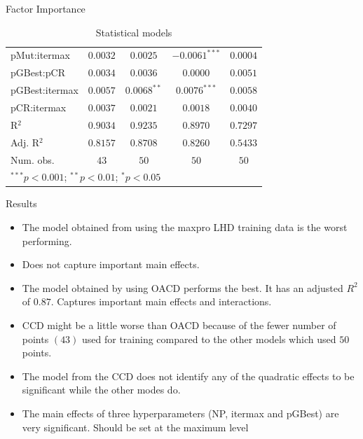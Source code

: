 \documentclass{beamer}
\begin{document}
\begin{frame}{Factor Importance}
\begin{table}
\begin{center}
{\begin{tabular}{l c c c c}
pMut:itermax   & $0.0032$        & $0.0025$        & $-0.0061^{***}$ & $0.0004$        \\
pGBest:pCR     & $0.0034$        & $0.0036$        & $0.0000$        & $0.0051$        \\
pGBest:itermax & $0.0057$        & $0.0068^{**}$   & $0.0076^{***}$  & $0.0058$        \\
pCR:itermax    & $0.0037$        & $0.0021$        & $0.0018$        & $0.0040$        \\
\hline
R$^2$          & $0.9034$        & $0.9235$        & $0.8970$        & $0.7297$        \\
Adj. R$^2$     & $0.8157$        & \cellcolor{blue!25}$0.8708$        & $0.8260$        & \cellcolor{yellow!50}$0.5433$        \\
Num. obs.      & $43$            & $50$            & $50$            & $50$            \\
\hline
\multicolumn{5}{l}{\scriptsize{$^{***}p<0.001$; $^{**}p<0.01$; $^{*}p<0.05$}}
\end{tabular}}
\caption{Statistical models}
\label{table:coefficients}
\end{center}
\end{table}
\end{frame}

\begin{frame}{Results}
\begin{itemize}
  \item The model obtained from using the maxpro LHD  training data is the worst performing.
  \item Does not capture important main effects.
  \item The model obtained by using OACD performs the best. It has an adjusted $R^2$ of $0.87$. Captures important main effects and interactions.
  \item CCD might be a little worse than OACD because of the fewer number of points $(43)$ used for training compared to the other models which used $50$ points.
  \item The model from the CCD does not identify any of the quadratic effects to be significant while the other modes do.
  \item The main effects of three hyperparameters (NP, itermax and pGBest) are very significant. Should be set at the maximum level
\end{itemize}
\end{frame}

\end{document}
